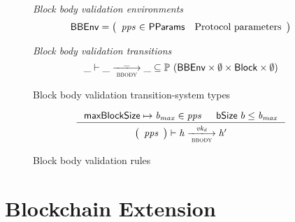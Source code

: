 \documentclass[11pt,a4paper]{article}
\newcommand{\powerset}[1]{\mathbb{P}~#1}
\newcommand{\var}[1]{\mathit{#1}}
\newcommand{\fun}[1]{\mathsf{#1}}
\newcommand{\type}[1]{\mathsf{#1}}
\newcommand{\trans}[2]{\xlongrightarrow[\textsc{#1}]{#2}}
\newcommand{\Block}{\type{Block}}
\newcommand{\ProtParams}{\type{PParams}} %
\newcommand{\bsizename}{bSize}
\newcommand{\bsize}[1]{\fun{\bsizename} ~ #1}
\begin{document}
\begin{figure}[ht]
  \emph{Block body validation environments}
  \begin{equation*}
    \BBEnv =
    \left(
      \begin{array}{r@{~\in~}lr}
        \var{pps} & \ProtParams & \text{Protocol parameters} \\
      \end{array}
    \right)
  \end{equation*}

  \emph{Block body validation transitions}
  \begin{equation*}
    \_ \vdash \var{\_} \trans{bbody}{\_} \var{\_} \subseteq
    \powerset (\BBEnv \times \emptyset \times \Block \times \emptyset)
  \end{equation*}
  \caption{Block body validation transition-system types}
  \label{fig:ts-types:bbody}
\end{figure}

\begin{figure}[ht]
  \begin{equation*}
    \inference
    { \maxblocksize \mapsto \var{b_{max}} \in \var{pps} && \bsize{b} \leq \var{b_{max}} \\
    }
    {
      \left(
        {\begin{array}{c}
          \var{pps} \\
        \end{array}}
      \right)
      \vdash
        {\var{h}}
      \trans{bbody}{\var{vk_d}}
        {\var{h'}}
    }
  \end{equation*}
  \caption{Block body validation rules}
  \label{fig:rules:bbody}
\end{figure}

\clearpage

\section{Blockchain Extension}
\label{sec:chain-extension}

\newcommand{\CEEnv}{\type{CEEnv}}
\newcommand{\CEState}{\type{CEState}}

\newcommand{\butxo}[1]{\fun{bUtxo}\ #1}
\newcommand{\bupdprop}[1]{\fun{bUpdProp}\ #1}
\newcommand{\bupdvotes}[1]{\fun{bUpdVotes}\ #1}
\newcommand{\bprotver}[1]{\fun{bProtVer}\ #1}
\newcommand{\bendorsment}[1]{\fun{bEndorsment}\ #1}

\newcommand{\UTxO}{\type{UTxO}}
\newcommand{\DIEnv}{\type{DIEnv}}
\newcommand{\DIState}{\type{DIState}}
\end{document}
